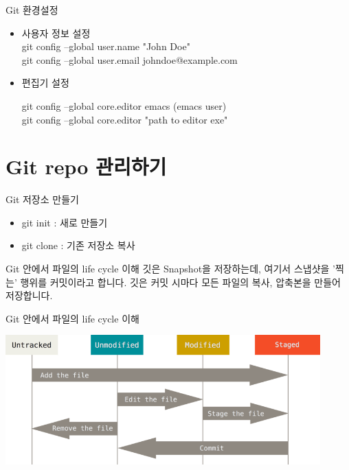 \documentclass{beamer}
\begin{document}
\begin{frame}{Git 환경설정}
\begin{itemize} 
\item 사용자 정보 설정 \\
 git config --global user.name "John Doe" \\
 git config --global user.email johndoe@example.com

\item 편집기 설정 

 git config --global core.editor emacs (emacs user) \\
 git config --global core.editor "path to editor exe"

\end{itemize}
\end{frame}


\section{Git repo 관리하기}


\begin{frame}{Git 저장소 만들기}

\begin{itemize} 
\item git init : 새로 만들기 
\item git clone : 기존 저장소 복사 
\end{itemize}
\end{frame}

\begin{frame}{Git 안에서 파일의 life cycle 이해}
깃은 Snapshot을 저장하는데, 여기서 스냅샷을 '찍는' 행위를 커밋이라고 합니다. 
깃은 커밋 시마다 모든 파일의 복사, 압축본을 만들어 저장합니다. 
\end{frame}
\begin{frame}{Git 안에서 파일의 life cycle 이해}
\begin{center}
\includegraphics[height=5cm,keepaspectratio]{lifecycle}
\end{center}
\end{frame}
\end{document}
